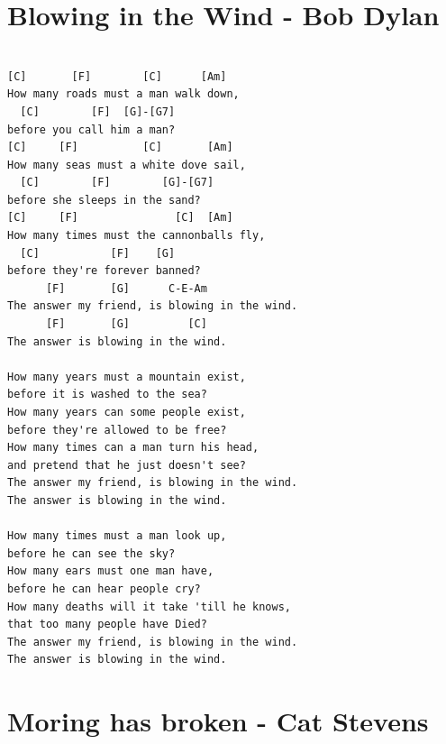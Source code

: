 \documentclass[]{book}
\let\stdsection\section
\renewcommand\section{\clearpage\stdsection}
\begin{document}
\hypertarget{blowing-in-the-wind---bob-dylan}{%
\section{Blowing in the Wind - Bob Dylan}\label{blowing-in-the-wind---bob-dylan}}

\begin{verbatim}

[C]       [F]        [C]      [Am] 
How many roads must a man walk down, 
  [C]        [F]  [G]-[G7]
before you call him a man?
[C]     [F]          [C]       [Am] 
How many seas must a white dove sail, 
  [C]        [F]        [G]-[G7]
before she sleeps in the sand?
[C]     [F]               [C]  [Am]
How many times must the cannonballs fly, 
  [C]           [F]    [G]
before they're forever banned?
      [F]       [G]      C-E-Am             
The answer my friend, is blowing in the wind.
      [F]       [G]         [C]
The answer is blowing in the wind.

How many years must a mountain exist, 
before it is washed to the sea?
How many years can some people exist, 
before they're allowed to be free? 
How many times can a man turn his head, 
and pretend that he just doesn't see?
The answer my friend, is blowing in the wind.
The answer is blowing in the wind.

How many times must a man look up, 
before he can see the sky?
How many ears must one man have, 
before he can hear people cry?
How many deaths will it take 'till he knows, 
that too many people have Died?
The answer my friend, is blowing in the wind.
The answer is blowing in the wind.

\end{verbatim}

\hypertarget{moring-has-broken---cat-stevens}{%
\section{Moring has broken - Cat Stevens}\label{moring-has-broken---cat-stevens}}
\end{document}
